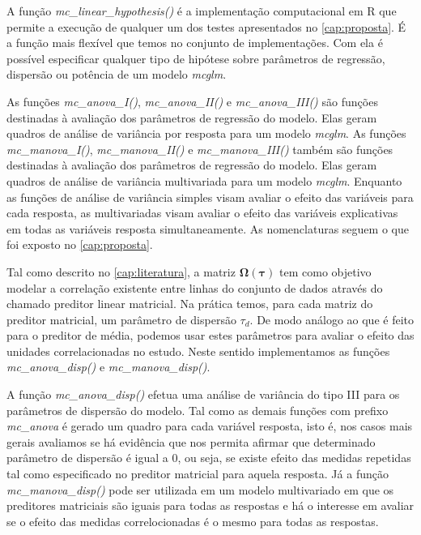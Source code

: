 A função \emph{mc\_linear\_hypothesis()} é a implementação computacional em R que permite a execução de qualquer um dos testes apresentados no \autoref{cap:proposta}. É a função mais flexível que temos no conjunto de implementações. Com ela é possível especificar qualquer tipo de hipótese sobre parâmetros de regressão, dispersão ou potência de um modelo \emph{mcglm}. 

As funções \emph{mc\_anova\_I()}, \emph{mc\_anova\_II()} e \emph{mc\_anova\_III()} são funções destinadas à avaliação dos parâmetros de regressão do modelo. Elas geram quadros de análise de variância por resposta para um modelo \emph{mcglm}. As funções \emph{mc\_manova\_I()}, \emph{mc\_manova\_II()} e \emph{mc\_manova\_III()} também são funções destinadas à avaliação dos parâmetros de regressão do modelo. Elas geram quadros de análise de variância multivariada para um modelo \emph{mcglm}. Enquanto as funções de análise de variância simples visam avaliar o efeito das variáveis para cada resposta, as multivariadas visam avaliar o efeito das variáveis explicativas em todas as variáveis resposta simultaneamente. As nomenclaturas seguem o que foi exposto no \autoref{cap:proposta}.

Tal como descrito no \autoref{cap:literatura}, a matriz $\boldsymbol{\Omega({\tau})}$ tem como objetivo modelar a correlação existente entre linhas do conjunto de dados através do chamado preditor linear matricial. Na prática temos, para cada matriz do preditor matricial, um parâmetro de dispersão $\tau_d$. De modo análogo ao que é feito para o preditor de média, podemos usar estes parâmetros para avaliar o efeito das unidades correlacionadas no estudo. Neste sentido implementamos as funções \emph{mc\_anova\_disp()} e \emph{mc\_manova\_disp()}. 

A função \emph{mc\_anova\_disp()} efetua uma análise de variância do tipo III para os parâmetros de dispersão do modelo. Tal como as demais funções com prefixo \emph{mc\_anova} é gerado um quadro para cada variável resposta, isto é, nos casos mais gerais avaliamos se há evidência que nos permita afirmar que determinado parâmetro de dispersão é igual a 0, ou seja, se existe efeito das medidas repetidas tal como especificado no preditor matricial para aquela resposta. Já a função \emph{mc\_manova\_disp()} pode ser utilizada em um modelo multivariado em que os preditores matriciais são iguais para todas as respostas e há o interesse em avaliar se o efeito das medidas correlocionadas é o mesmo para todas as respostas.

